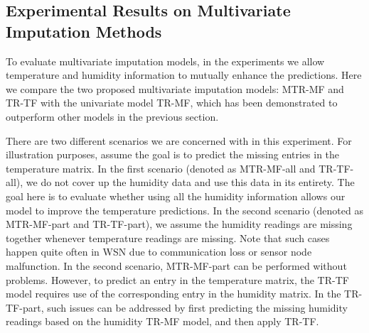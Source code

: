 \subsection{Experimental Results on Multivariate Imputation Methods}




To evaluate multivariate imputation models, in the experiments we allow temperature and humidity information to mutually enhance the predictions.
Here we compare the two proposed multivariate imputation models: MTR-MF and TR-TF with the univariate model TR-MF, which has been demonstrated to outperform other models in the previous section. 

There are two different scenarios we are concerned with in this experiment.
For illustration purposes, assume the goal is to predict the missing entries in the temperature matrix.
In the first scenario (denoted as MTR-MF-all and TR-TF-all), we do not cover up the humidity data and use this data in its entirety.
The goal here is to evaluate whether using all the humidity information allows our model to improve the temperature predictions.
In the second scenario (denoted as MTR-MF-part and TR-TF-part), we assume the humidity readings are missing together whenever temperature readings are missing.
Note that such cases happen quite often in WSN due to communication loss or sensor node malfunction.
In the second scenario, MTR-MF-part can be performed without problems.
However, to predict an entry in the temperature matrix, the TR-TF model requires use of the corresponding entry in the humidity matrix.
In the TR-TF-part, such issues can be addressed by first predicting the missing humidity readings based on the humidity TR-MF model, and then apply TR-TF.


